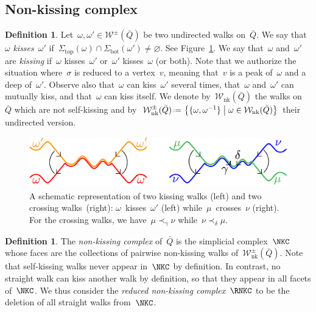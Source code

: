 \documentclass{amsart}
\theoremstyle{definition}
\newtheorem{definition}[theorem]{Definition}
\newcommand{\set}[2]{\left\{ #1 \;\middle|\; #2 \right\}} %
\newcommand{\eqdef}{\mbox{\,\raisebox{0.2ex}{\scriptsize\ensuremath{\mathrm:}}\ensuremath{=}\,}} %
\newcommand{\fref}[1]{Figure~\ref{#1}} %
\newcommand{\ie}{\textit{i.e.}~} %
\newcommand{\darkblue}{\color{darkblue}} %
\newcommand{\defn}[1]{\textsl{\darkblue #1}} %
\newcommand{\strings}{\mathcal{S}} %
\newcommand{\walks}{\mathcal{W}} %
\newcommand{\NKWalks}{\mathcal{W}_\mathrm{nk}} %
\renewcommand{\top}{\mathrm{top}} %
\newcommand{\bottom}{\mathrm{bot}} %
\begin{document}
\subsection{Non-kissing complex}

\begin{definition}
\label{def:kiss}
Let~$\omega,\omega' \in \walks^\pm(\bar Q)$ be two undirected walks on~$\bar Q$.
We say that~$\omega$ \defn{kisses}~$\omega'$ if~$\Sigma_\top(\omega) \cap \Sigma_\bottom(\omega') \ne \varnothing$.
See \fref{fig:kissingCrossing}.
We say that~$\omega$ and~$\omega'$ are \defn{kissing} if~$\omega$ kisses~$\omega'$ or~$\omega'$ kisses~$\omega$ (or both).
Note that we authorize the situation where~$\sigma$ is reduced to a vertex~$v$, meaning that~$v$ is a peak of~$\omega$ and a deep of~$\omega'$.
Observe also that~$\omega$ can kiss~$\omega'$ several times, that~$\omega$ and~$\omega'$ can mutually kiss, and that~$\omega$ can kiss itself.
We denote by~$\NKWalks(\bar Q)$ the walks on~$\bar Q$ which are not self-kissing and by~$\NKWalks^\pm(\bar Q) \eqdef \set{\{\omega, \omega^{-1}\}}{\omega \in \NKWalks(\bar Q)}$ their undirected version.
\end{definition}

\begin{figure}
	\capstart
	\centerline{\includegraphics[scale=1]{kissingCrossing}}
	\caption{A schematic representation of two kissing walks (left) and two crossing walks~(right): $\omega$~kisses~$\omega'$ (left) while~$\mu$~crosses~$\nu$ (right). For the crossing walks, we have~$\mu \prec_\gamma \nu$ while~$\nu \prec_\delta \mu$.}
	\label{fig:kissingCrossing}
\end{figure}

\begin{definition}
\label{def:nKc}
The \defn{non-kissing complex} of~$\bar Q$ is the simplicial complex~$\NKC$ whose faces are the collections of pairwise non-kissing walks of~$\NKWalks^\pm(\bar Q)$.
Note that self-kissing walks never appear in~$\NKC$ by definition.
In contrast, no straight walk can kiss another walk by definition, so that they appear in all facets of~$\NKC$.
We thus consider the \defn{reduced non-kissing complex}~$\RNKC$ to be the deletion of all straight walks from~$\NKC$.
\end{definition}
\end{document}
